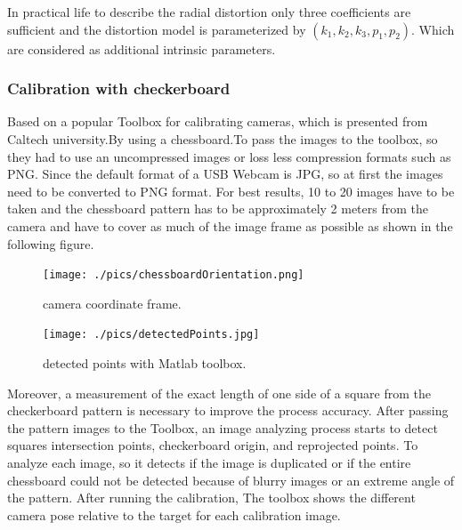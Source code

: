 \documentclass[journal,final,a4paper,twoside]{PS}
\begin{document}
In practical life to describe the radial distortion only three coefficients are sufficient and the distortion model is parameterized by $(k_1,k_2,k_3,p_1,p_2)$. Which are considered as additional intrinsic parameters.

\subsubsection{Calibration with checkerboard}
\label{sec:checkerboard}
Based on a popular Toolbox for calibrating cameras, which is presented from Caltech university.By using a chessboard.To pass the images to the toolbox, so they had to use an uncompressed images or loss less compression formats such as PNG. Since the default format of a USB Webcam is JPG, so at first the images need to be converted to PNG format. For best results, 10 to 20 images have to be taken and the chessboard pattern has to be approximately 2 meters from the camera and have to cover as much of the image frame as possible as shown in the following figure.


\begin{figure}[h]
\centering
\parbox{4cm}{
\texttt{[image: ./pics/chessboardOrientation.png]}
\caption{camera coordinate frame\cite{matlab}.}
\label{fig:cameraCoordinateFrame}}
\qquad
\begin{minipage}{4cm}
\texttt{[image: ./pics/detectedPoints.jpg]}
\caption{detected points with Matlab toolbox\cite{matlab}.}
\label{fig:detectedPoints}
\end{minipage}
\end{figure}


Moreover, a measurement of the exact length of one side of a square from the checkerboard pattern is necessary to improve the process accuracy. After passing the pattern images to the Toolbox, an image analyzing process starts to detect squares intersection points, checkerboard origin, and reprojected points.
To analyze each image, so it detects if the image is duplicated or if the entire chessboard could not be detected because of blurry images or an extreme angle of the pattern. After running the calibration,  The toolbox shows the different camera pose relative to the target for each calibration image.
\end{document}
